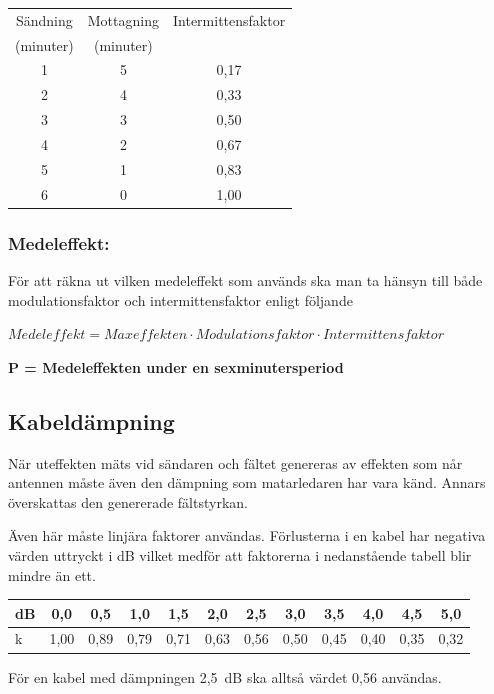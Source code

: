 \begin{tabular}{|c|c|c|}
	\hline
	Sändning  & Mottagning & Intermittensfaktor \\
	(minuter) & (minuter)  & \\ \hline
	1 & 5 & 0,17 \\ \hline
	2 & 4 & 0,33 \\ \hline
	3 & 3 & 0,50 \\ \hline
	4 & 2 & 0,67 \\ \hline
	5 & 1 & 0,83 \\ \hline
	6 & 0 & 1,00 \\ \hline
\end{tabular}

\subsubsection{Medeleffekt:}

För att räkna ut vilken medeleffekt som används ska man ta hänsyn
till både modulationsfaktor och intermittensfaktor enligt följande

\(Medeleffekt = Maxeffekten \cdot Modulationsfaktor \cdot Intermittensfaktor\)

\textbf{P = Medeleffekten under en sexminutersperiod}

\subsection{Kabeldämpning}

När uteffekten mäts vid sändaren och fältet genereras av effekten som
når antennen måste även den dämpning som matarledaren har vara känd.
Annars överskattas den genererade fältstyrkan.

Även här måste linjära faktorer användas.
Förlusterna i en kabel har negativa värden uttryckt i dB vilket medför att
faktorerna i nedanstående tabell blir mindre än ett.

\begin{tabular}{|l|c|c|c|c|c|c|c|c|c|c|c|}
	\hline
	dB & 0,0  & 0,5  & 1,0  & 1,5  & 2,0  & 2,5  & 3,0  & 3,5  & 4,0  & 4,5  & 5,0 \\ \hline
	k  & 1,00 & 0,89 & 0,79 & 0,71 & 0,63 & 0,56 & 0,50 & 0,45 & 0,40 & 0,35 & 0,32 \\ \hline
\end{tabular}

För en kabel med dämpningen 2,5~dB ska alltså värdet 0,56 användas.


